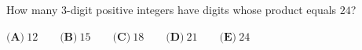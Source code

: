 How many $3$-digit positive integers have digits whose product equals $24$?

$\textbf{(A)}\ 12\qquad\textbf{(B)}\ 15\qquad\textbf{(C)}\ 18\qquad\textbf{(D)}\ 21\qquad\textbf{(E)}\ 24$

